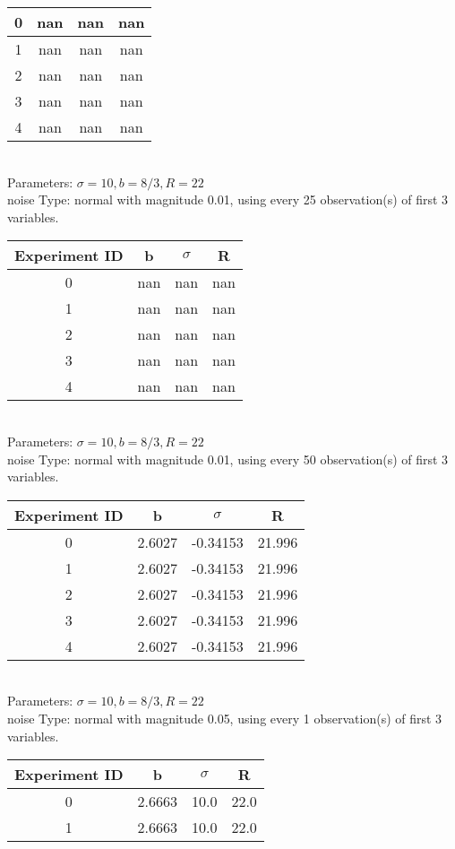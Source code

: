 \begin{multicols}{3}
\begin{tabular}{cccc}
0 & nan & nan & nan\\ \hline 
 1 & nan & nan & nan\\ \hline 
 2 & nan & nan & nan\\ \hline 
 3 & nan & nan & nan\\ \hline 
 4 & nan & nan & nan\\ \hline 
 \end{tabular}\\
Parameters: $\sigma=10, b=8/3, R=22$\\
noise Type: normal with magnitude 0.01, using every 25 observation(s) of first 3 variables.\\
\begin{tabular}{cccc}
\hline Experiment ID & b & $\sigma$ & R \\ \hline 
0 & nan & nan & nan\\ \hline 
 1 & nan & nan & nan\\ \hline 
 2 & nan & nan & nan\\ \hline 
 3 & nan & nan & nan\\ \hline 
 4 & nan & nan & nan\\ \hline 
 \end{tabular}\\
Parameters: $\sigma=10, b=8/3, R=22$\\
noise Type: normal with magnitude 0.01, using every 50 observation(s) of first 3 variables.\\
\begin{tabular}{cccc}
\hline Experiment ID & b & $\sigma$ & R \\ \hline 
0 & 2.6027 & -0.34153 & 21.996\\ \hline 
 1 & 2.6027 & -0.34153 & 21.996\\ \hline 
 2 & 2.6027 & -0.34153 & 21.996\\ \hline 
 3 & 2.6027 & -0.34153 & 21.996\\ \hline 
 4 & 2.6027 & -0.34153 & 21.996\\ \hline 
 \end{tabular}\\
Parameters: $\sigma=10, b=8/3, R=22$\\
noise Type: normal with magnitude 0.05, using every 1 observation(s) of first 3 variables.\\
\begin{tabular}{cccc}
\hline Experiment ID & b & $\sigma$ & R \\ \hline 
0 & 2.6663 & 10.0 & 22.0\\ \hline 
 1 & 2.6663 & 10.0 & 22.0\\ \hline 

\end{tabular}
\end{multicols}
